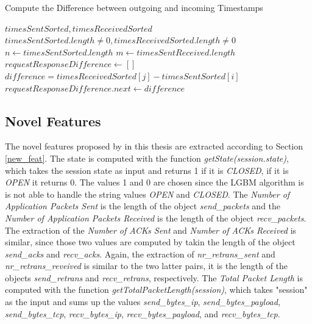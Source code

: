\begin{center}
\begin{algorithm}
\caption{Compute the Difference between outgoing and incoming Timestamps}
\begin{algorithmic}
\Require $timesSentSorted, timesReceivedSorted$
\Ensure $timesSentSorted.length \neq 0, timesReceivedSorted.length \neq 0$
\State $n \leftarrow timesSentSorted.length$
\State $m \leftarrow timesSentReceived.length$
\State $requestResponseDifference \leftarrow []$
\State $difference = timesReceivedSorted[j] - timesSentSorted[i]$
\State $requestResponseDifference.next \leftarrow difference$
\end{algorithmic}
\label{alg:reqResp}
\end{algorithm}
\end{center}

\subsection{Novel Features}
The novel features proposed by in this thesis are extracted according to Section \ref{new_feat}. The state is computed with the function \textit{getState(session.state)}, which takes the session state as input and returns 1 if it is \textit{CLOSED}, if it is \textit{OPEN} it returns 0. The values 1 and 0 are chosen since the LGBM algorithm is is not able to handle the string values \textit{OPEN} and \textit{CLOSED}. The \textit{Number of Application Packets Sent} is the length of the object \textit{send\_packets} and the \textit{Number of Application Packets Received} is the length of the object \textit{recv\_packets}. The extraction of the \textit{Number of ACKs Sent} and \textit{Number of ACKs Received} is similar, since those two values are computed by takin the length of the object \textit{send\_acks} and \textit{recv\_acks}. Again, the extraction of \textit{nr\_retrans\_sent} and \textit{nr\_retrans\_reveived} is similar to the two latter pairs, it is the length of the objects \textit{send\_retrans} and \textit{recv\_retrans}, respectively. The \textit{Total Packet Length} is computed with the function \textit{getTotalPacketLength(session)}, which takes "session" as the input and sums up the values \textit{send\_bytes\_ip}, \textit{send\_bytes\_payload}, \textit{send\_bytes\_tcp}, \textit{recv\_bytes\_ip}, \textit{recv\_bytes\_payload}, and \textit{recv\_bytes\_tcp}.

